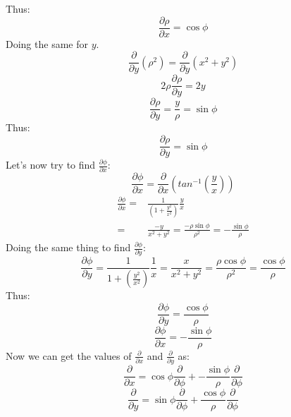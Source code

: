                 Thus:
                \begin{equation}\label{eq:partialrhowrtx}
                   \frac{\partial \rho}{\partial x} = \cos\phi
                \end{equation}
                Doing the same for $y$.
                $$\frac{\partial}{\partial y}\left(\rho^2\right) = \frac{\partial}{\partial y}\left(x^2 + y^2\right)$$
                $$2\rho\frac{\partial \rho}{\partial y} = 2y$$
                $$\frac{\partial \rho}{\partial y} = \frac{y}{\rho} = \sin\phi$$
                Thus:
                \begin{equation}\label{eq:partialrhowrty}
                    \frac{\partial \rho}{\partial y} = \sin\phi
                \end{equation}
                Let's now try to find $\frac{\partial \phi}{\partial x}$:
                $$\frac{\partial \phi}{\partial x} = \frac{\partial}{\partial x}\left(tan^{-1}\left(\frac{y}{x}\right)\right)$$
                \begin{align*}
                \frac{\partial \phi}{\partial x} = & \frac{1}{\left(1 + \frac{y^2}{x^2}\right)}\frac{y}{x}\\
                = & \frac{-y}{x^2+y^2} = \frac{-\rho\sin\phi}{\rho^2} = -\frac{\sin\phi}{\rho}
                \end{align*}
                Doing the same thing to find $\frac{\partial \phi}{\partial y}$:
                $$\frac{\partial \phi}{\partial y} = \frac{1}{1 + \left(\frac{y^2}{x^2}\right)}\frac{1}{x} = 
                \frac{x}{x^2+y^2}=\frac{\rho \cos\phi}{\rho^2} = \frac{\cos\phi}{\rho}$$
                Thus:
                \begin{equation}\label{eq:partialphiwrty}
                   \frac{\partial \phi}{\partial y} = \frac{\cos\phi}{\rho}
                \end{equation}
                \begin{equation}\label{eq:partialphiwrtx}
                    \frac{\partial \phi}{\partial x} = -\frac{\sin\phi}{\rho}
                \end{equation}
                Now we can get the values of $\frac{\partial}{\partial x}$ and $\frac{\partial}{\partial y}$ as:
                $$\frac{\partial}{\partial x} = \cos\phi\frac{\partial}{\partial \phi} + 
                    -\frac{\sin\phi}{\rho}\frac{\partial}{\partial \phi}
                $$
                $$\frac{\partial}{\partial y} = \sin\phi\frac{\partial}{\partial \phi} + 
                    \frac{\cos\phi}{\rho}\frac{\partial}{\partial \phi}
                $$
